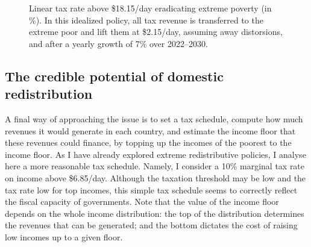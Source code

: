 
\begin{figure}[h]
  \caption{Linear tax rate above \$18.15/day eradicating extreme poverty (in \%). In this idealized policy, all tax revenue is transferred to the extreme poor and lift them at \$2.15/day, assuming away distorsions, and after a yearly growth of 7\% over 2022--2030.
  }\label{fig:antipoverty_tax_18}
\end{figure}


\subsection{The credible potential of domestic redistribution}

A final way of approaching the issue is to set a tax schedule, compute how much revenues it would generate in each country, and estimate the income floor that these revenues could finance, by topping up the incomes of the poorest to the income floor. As I have already explored extreme redistributive policies, I analyse here a more reasonable tax schedule. Namely, I consider a 10\% marginal tax rate on income above \$6.85/day. Although the taxation threshold may be low and the tax rate low for top incomes, %
this simple tax schedule seems to correctly reflect the fiscal capacity of governments. Note that the value of the income floor depends on the whole income distribution: the top of the distribution determines the revenues that can be generated; and the bottom dictates the cost of raising low incomes up to a given floor. 

